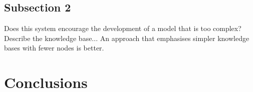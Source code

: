 \subsection{Subsection 2}

Does this system encourage the development of a model that is too complex? Describe the knowledge base... An approach that emphasises simpler knowledge bases with fewer nodes is better.

\section{Conclusions}

